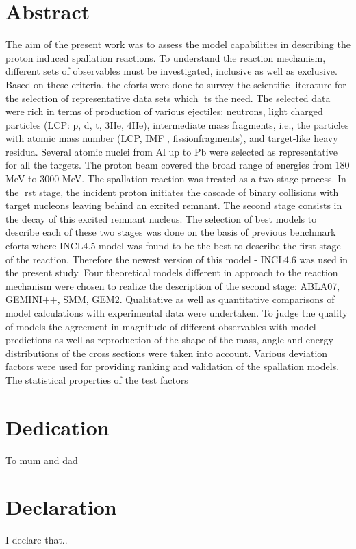 \documentclass[12pt]{report}
\begin{document}

\tableofcontents
\chapter*{Abstract}
The aim of the present work was to assess the model capabilities in describing the proton induced spallation reactions. To understand the reaction mechanism, different sets of observables must be investigated, inclusive as well as exclusive. Based on these criteria, the eforts were done to survey the scientific literature for the selection of representative  data sets which ts the need. The selected data were rich in terms of production of various ejectiles: neutrons, light charged particles (LCP: p, d, t, 3He, 4He), intermediate mass fragments, i.e., the particles with atomic mass number (LCP, IMF , fissionfragments), and target-like heavy residua. Several atomic nuclei from Al up to Pb were selected as representative for all the targets. The proton beam covered the broad range of energies from 180 MeV to 3000 MeV. The spallation reaction was treated as a two stage process. In the rst stage, the incident proton initiates the cascade of binary collisions with target nucleons leaving
behind an excited remnant. The second stage consists in the decay of this excited remnant nucleus. The selection of best models to describe each of these two stages was done on
the basis of previous benchmark eforts where INCL4.5 model was found to be the best to describe the first stage of the reaction. Therefore the newest version of this model -
INCL4.6 was used in the present study. Four theoretical models different in approach  to the reaction mechanism were chosen to realize the description of the second stage: ABLA07, GEMINI++, SMM, GEM2. Qualitative as well as quantitative comparisons of model calculations with experimental data were undertaken. To judge the quality of models the agreement in magnitude of different observables with model predictions as
well as reproduction of the shape of the mass, angle and energy distributions of the cross sections were taken into account. Various deviation factors were used for providing ranking and validation of the spallation models. The statistical properties of the test factors
 
\chapter*{Dedication}
To mum and dad
 
\chapter*{Declaration}
I declare that..
 
\end{document}
